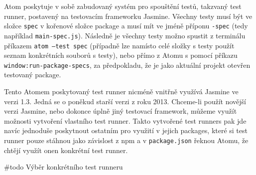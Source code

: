 Atom poskytuje v sobě zabudovaný systém pro spouštění testů, takzvaný test runner, postavený na testovacím frameworku
Jasmine. Všechny testy musí být ve složce \texttt{spec} v kořenové složce package a musí mít ve jméně příponu
\texttt{-spec} (tedy například \texttt{main-spec.js}). Následně je všechny testy možno spustit z
terminálu příkazem \texttt{atom --test spec} (případně lze namísto celé složky s testy použít seznam
konkrétních souborů s testy), nebo přímo z Atomu s pomocí příkazu \texttt{window:run-package-specs}, za
předpokladu, že je jako aktuální projekt otevřen testovaný package. \cite{atom-man-specs}

Tento Atomem poskytovaný test runner nicméně vnitřně využívá Jasmine ve verzi 1.3. \cite{atom-man-specs} Jedná se o
poněkud starší verzi z roku 2013. \cite{jasmine-old-release} Chceme-li použít novější verzi Jasmine, nebo dokonce úplně
jiný testovací framework, můžeme využít možnosti vytvoření vlastního test runner. Takto vytvořené test runners pak jde
navíc jednoduše poskytnout ostatním pro využití v jejich packages, které si test runner pouze stáhnou jako závislost z
npm a v \texttt{package.json} řeknou Atomu, že chtějí využít onen konkrétní test runner. \cite{atom-man-specs}

\#todo Výběr konkrétního test runneru
